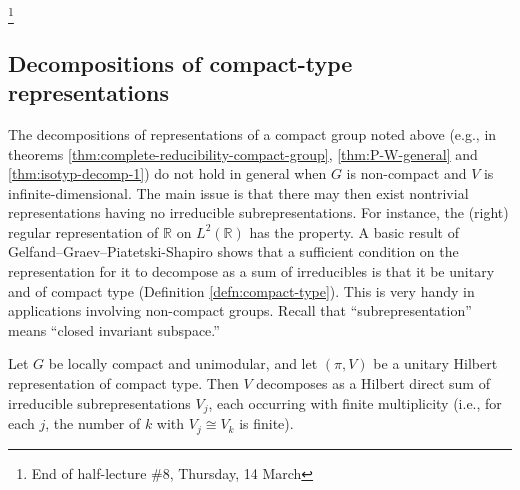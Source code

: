 \documentclass[reqno]{amsart} 
\begin{document}
\footnote{End of half-lecture \#8, Thursday, 14 March}

\subsection{Decompositions of compact-type representations}
The decompositions of representations of a compact group noted above (e.g., in theorems \ref{thm:complete-reducibility-compact-group}, \ref{thm:P-W-general} and \ref{thm:isotyp-decomp-1}) do not hold in general when $G$ is non-compact and $V$ is infinite-dimensional.  The main issue is that there may then exist nontrivial representations having no irreducible subrepresentations.  For instance, the (right) regular representation of $\mathbb{R}$ on $L^2(\mathbb{R})$ has the property.  A basic result of Gelfand--Graev--Piatetski-Shapiro shows that a sufficient condition on the representation for it to decompose as a sum of irreducibles is that it be unitary and of compact type (Definition \ref{defn:compact-type}).  This is very handy in applications involving non-compact groups.  Recall that ``subrepresentation'' means ``closed invariant subspace.''
\begin{theorem}
  Let $G$ be locally compact and unimodular, and let $(\pi,V)$ be a unitary Hilbert representation of compact type.  Then $V$ decomposes as a Hilbert direct sum of irreducible subrepresentations $V_j$, each occurring with finite multiplicity (i.e., for each $j$, the number of $k$ with $V_j \cong V_k$ is finite).
\end{theorem}
\end{document}
